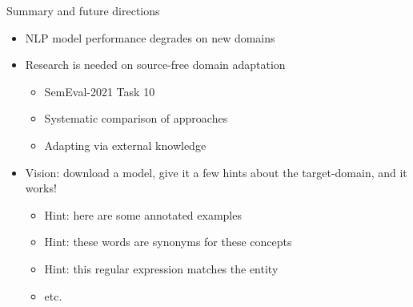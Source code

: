 \documentclass[14pt]{beamer}
\begin{document}
\begin{frame}{Summary and future directions}
\begin{itemize}
\item NLP model performance degrades on new domains
\item Research is needed on source-free domain adaptation
\begin{itemize}
\item SemEval-2021 Task 10 \cite{laparra-etal-2021-semeval}
\item Systematic comparison of approaches \cite{su-etal-2022-comparison}
\item Adapting via external knowledge \cite{xu-bethard-2021-triplet}
\end{itemize}
\pause
\bigskip
\item Vision: download a model, give it a few hints about the target-domain, and it works!
\begin{itemize}
\item Hint: here are some annotated examples
\item Hint: these words are synonyms for these concepts
\item Hint: this regular expression matches the entity
\item etc.
\end{itemize}
\end{itemize}
\end{frame}
\end{document}
